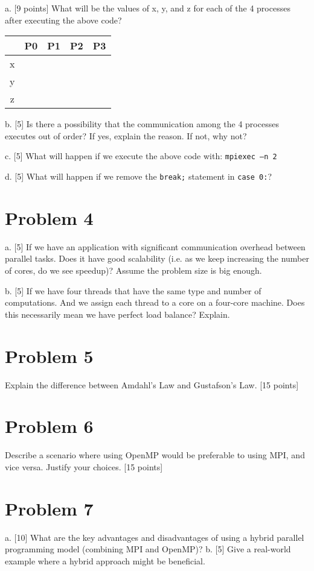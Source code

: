 \documentclass{article}
\begin{document}
a. [9 points] What will be the values of x, y, and z for each of the 4 processes after executing the above code?

\begin{tabular}{|c|c|c|c|c|}
\hline
 & P0 & P1 & P2 & P3 \\
\hline
x &  &  &  &  \\
y &  &  &  &  \\
z &  &  &  &  \\
\hline
\end{tabular}

b. [5] Is there a possibility that the communication among the 4 processes executes out of order? If yes, explain the reason. If not, why not?

c. [5] What will happen if we execute the above code with: \texttt{mpiexec –n 2}

d. [5] What will happen if we remove the \texttt{break;} statement in \texttt{case 0:}?


\section*{Problem 4}
a. [5] If we have an application with significant communication overhead between parallel tasks. Does it have good scalability (i.e. as we keep increasing the number of cores, do we see speedup)? Assume the problem size is big enough.

b. [5] If we have four threads that have the same type and number of computations. And we assign each thread to a core on a four-core machine. Does this necessarily mean we have perfect load balance? Explain.


\section*{Problem 5}
Explain the difference between Amdahl's Law and Gustafson's Law.  [15 points]


\section*{Problem 6}
Describe a scenario where using OpenMP would be preferable to using MPI, and vice versa. Justify your choices. [15 points]


\section*{Problem 7}
a. [10] What are the key advantages and disadvantages of using a hybrid parallel programming model (combining MPI and OpenMP)?
b. [5] Give a real-world example where a hybrid approach might be beneficial.
\end{document}
